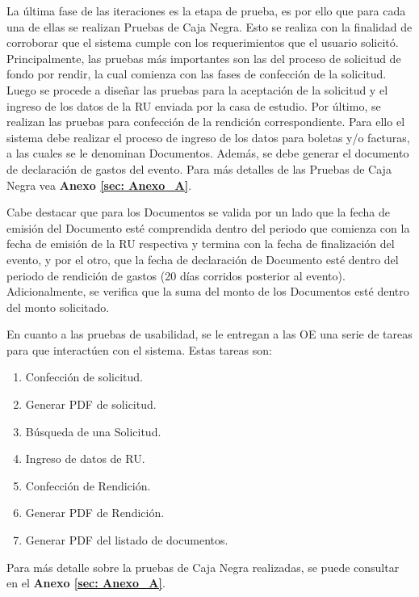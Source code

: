 La última fase de las iteraciones es la etapa de prueba, es por ello que para cada una de ellas se realizan Pruebas de Caja Negra. Esto se realiza con la finalidad de corroborar que el sistema cumple con los requerimientos que el usuario solicitó. Principalmente, las pruebas más importantes son las del proceso de solicitud de fondo por rendir, la cual comienza con las fases de confección de la solicitud. Luego se procede a diseñar las pruebas para la aceptación de la solicitud y el ingreso de los datos de la RU enviada por la casa de estudio. Por último, se realizan las pruebas para confección de la rendición correspondiente. Para ello el sistema debe realizar el proceso de ingreso de los datos para boletas y/o facturas, a las cuales se le denominan Documentos. Además, se debe generar el documento de declaración de gastos del evento. Para más detalles de las Pruebas de Caja Negra vea \textbf{Anexo \ref{sec: Anexo_A}}.

Cabe destacar que para los Documentos se valida por un lado que la fecha de emisión del Documento esté comprendida dentro del periodo que comienza con la fecha de emisión de la RU respectiva y termina con la fecha de finalización del evento, y por el otro, que la fecha de declaración de Documento esté dentro del periodo de rendición de gastos (20 días corridos posterior al evento). Adicionalmente, se verifica que la suma del monto de los Documentos esté dentro del monto solicitado. 

En cuanto a las pruebas de usabilidad, se le entregan a las OE una serie de tareas para que interactúen con el sistema. Estas tareas son: 

\begin{enumerate}
    \item Confección de solicitud.
    \item Generar PDF de solicitud.
    \item Búsqueda de una Solicitud.
    \item Ingreso de datos de RU.
    \item Confección de Rendición.
    \item Generar PDF de Rendición.
    \item Generar PDF del listado de documentos.
\end{enumerate}

Para más detalle sobre la pruebas de Caja Negra realizadas, se puede consultar en el \textbf{Anexo \ref{sec: Anexo_A}}.

